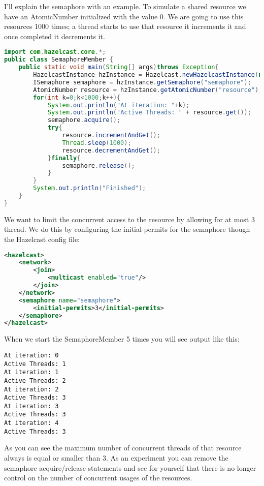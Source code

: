 I'll explain the semaphore with an example. To simulate a shared resource we have an AtomicNumber initialized with the value 0. We are going to use this resources 1000 times; a thread starts to use that resource it increments it and once completed it decrements it.
\begin{lstlisting}[language=java]
import com.hazelcast.core.*;
public class SemaphoreMember {
    public static void main(String[] args)throws Exception{
        HazelcastInstance hzInstance = Hazelcast.newHazelcastInstance(null);
        ISemaphore semaphore = hzInstance.getSemaphore("semaphore");
        AtomicNumber resource = hzInstance.getAtomicNumber("resource");
        for(int k=0;k<1000;k++){
            System.out.println("At iteration: "+k);
            System.out.println("Active Threads: " + resource.get());
            semaphore.acquire();
            try{
                resource.incrementAndGet();
                Thread.sleep(1000);
                resource.decrementAndGet();
            }finally{
                semaphore.release();
            }
        }
        System.out.println("Finished");
    }
}
\end{lstlisting}
We want to limit the concurrent access to the resource by allowing for at most 3 thread. We do this by configuring the initial-permits for the semaphore though the Hazelcast config file:
\begin{lstlisting}[language=xml]
<hazelcast>
    <network>
        <join>
            <multicast enabled="true"/>
        </join>
    </network>
    <semaphore name="semaphore">
        <initial-permits>3</initial-permits>
    </semaphore>
</hazelcast>
\end{lstlisting}
When we start the SemaphoreMember 5 times you will see output like this:
\begin{lstlisting}
At iteration: 0
Active Threads: 1
At iteration: 1
Active Threads: 2
At iteration: 2
Active Threads: 3
At iteration: 3
Active Threads: 3
At iteration: 4
Active Threads: 3
\end{lstlisting}
As you can see the maximum number of concurrent threads of that resource always is equal or smaller than 3. As an experiment you can remove the semaphore acquire/release statements and see for yourself that there is no longer control on the number of concurrent usages of the resources.


